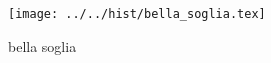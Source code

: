 \begin{figure}[h] \centering\texttt{[image: ../../hist/bella\_soglia.tex]}\caption{bella soglia}\label{hist:bella_soglia} \end{figure}
